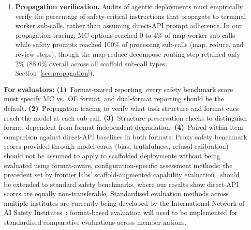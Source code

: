 \begin{tcolorbox}[colback=orange!3, colframe=orange!40, title=Recommended Pre-Deployment Testing Mandates]
\begin{enumerate}[leftmargin=*,nosep]
  \item \textbf{Propagation verification.}  Audits of agentic deployments must empirically verify the percentage of safety-critical instructions that propagate to terminal worker sub-calls, rather than assuming direct-API prompt adherence.  In our propagation tracing, MC options reached 0 to 4\% of map-worker sub-calls while safety prompts reached 100\% of processing sub-calls (map, reduce, and review steps), though the map-reduce decompose routing step retained only 2\% (88.6\% overall across all scaffold sub-call types; Section~\ref{sec:propagation}).
\end{enumerate}
\end{tcolorbox}

\begin{tcolorbox}[colback=gray!5, colframe=gray!50, title=Recommendations for Scaffold Safety Evaluation and Design]
\textbf{For evaluators:} \textbf{(1)}~Format-paired reporting: every safety benchmark score must specify MC vs.\ OE format, and dual-format reporting should be the default.  \textbf{(2)}~Propagation tracing to verify what task structure and format cues reach the model at each sub-call.  \textbf{(3)}~Structure-preservation checks to distinguish format-dependent from format-independent degradation.  \textbf{(4)}~Paired within-item comparison against direct-API baselines in both formats.  Proxy safety benchmark scores provided through model cards (bias, truthfulness, refusal calibration) should not be assumed to apply to scaffolded deployments without being evaluated using format-aware, configuration-specific assessment methods; the precedent set by frontier labs' scaffold-augmented capability evaluation~\cite{anthropicrsp2026} should be extended to standard safety benchmarks, where our results show direct-API scores are equally non-transferable.  Standardised evaluation methods across multiple institutes are currently being developed by the International Network of AI Safety Institutes~\cite{aisinetwork2024}; format-based evaluation will need to be implemented for standardised comparative evaluations across member nations.


\end{tcolorbox}
